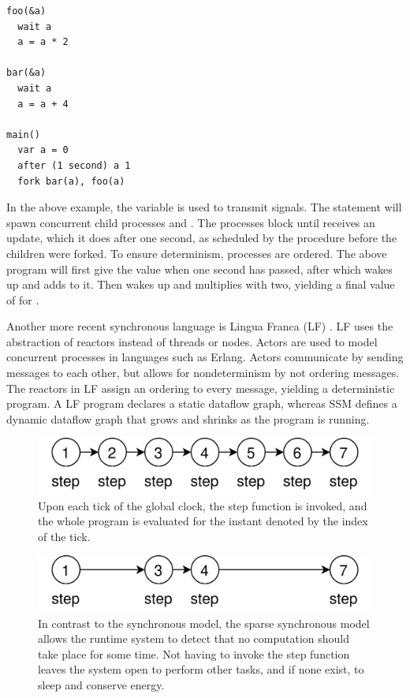 \begin{verbatim}
foo(&a)
  wait a
  a = a * 2

bar(&a)
  wait a
  a = a + 4

main()
  var a = 0
  after (1 second) a 1
  fork bar(a), foo(a)
\end{verbatim}

In the above example, the variable  is used to transmit signals. The  statement will spawn concurrent
child processes  and . The processes block until  receives an update, which it does after one second,
as scheduled by the  procedure before the children were forked. To ensure determinism, processes are ordered. The
above program will first give  the value  when one second has passed, after which  wakes up and
adds  to it. Then  wakes up and multiplies  with two, yielding a final value of  for .

Another more recent synchronous language is Lingua Franca (LF) \cite{DBLP:journals/tecs/LohstrohMBL21}. LF uses the abstraction
of reactors instead of threads or nodes. Actors are used to model concurrent processes in languages such as Erlang. Actors
communicate by sending messages to each other, but allows for nondeterminism by not ordering messages.
The reactors in LF assign an ordering to every message, yielding a deterministic program.
A LF program declares a static dataflow graph, whereas SSM defines a dynamic dataflow graph that grows and shrinks as the
program is running.

\begin{figure}
    \centering
    \includegraphics[scale=0.2]{graphics/clock-governed.png}
    \caption{Upon each tick of the global clock, the step function is invoked, and the whole program
    is evaluated for the instant denoted by the index of the tick.}
    \label{graphics:global-clock}
\end{figure}

\begin{figure}
    \centering
    \includegraphics[scale=0.2]{graphics/sparse-clock.png}
    \caption{In contrast to the synchronous model, the sparse synchronous model allows the runtime system to
    detect that no computation should take place for some time. Not having to invoke the step function
    leaves the system open to perform other tasks, and if none exist, to sleep and conserve energy.}
    \label{graphics:sparse-clock}
\end{figure}

